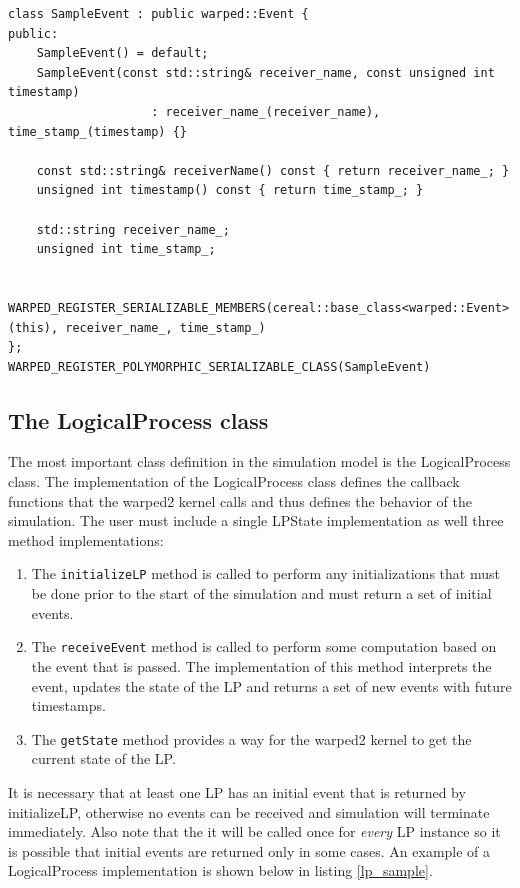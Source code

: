 \documentclass[11pt]{book}
\begin{document}
\begin{lstlisting}[caption=Sample \textsc{warped2} Event Definition, label=event_sample, float]
class SampleEvent : public warped::Event {
public:
    SampleEvent() = default;
    SampleEvent(const std::string& receiver_name, const unsigned int timestamp)
                    : receiver_name_(receiver_name), time_stamp_(timestamp) {}

    const std::string& receiverName() const { return receiver_name_; }
    unsigned int timestamp() const { return time_stamp_; }

    std::string receiver_name_;
    unsigned int time_stamp_;

    WARPED_REGISTER_SERIALIZABLE_MEMBERS(cereal::base_class<warped::Event>(this), receiver_name_, time_stamp_)
};
WARPED_REGISTER_POLYMORPHIC_SERIALIZABLE_CLASS(SampleEvent)
\end{lstlisting}

\subsection{The LogicalProcess class}

The most important class definition in the simulation model is the LogicalProcess class. The
implementation of the LogicalProcess class defines the callback functions that the warped2 kernel
calls and thus defines the behavior of the simulation. The user must include a single LPState
implementation as well three method implementations:

\begin{enumerate}

    \item The \texttt{initializeLP} method is called to perform any initializations that must
        be done prior to the start of the simulation and must return a set of initial events.
    \item The \texttt{receiveEvent} method is called to perform some computation based on the event
        that is passed. The implementation of this method interprets the event, updates the state
        of the LP and returns a set of new events with future timestamps.
    \item The \texttt{getState} method provides a way for the warped2 kernel to get the current
        state of the LP.

\end{enumerate}

It is necessary that at least one LP has an initial event that is returned by
initializeLP, otherwise no events can be received and simulation will terminate immediately.
Also note that the it will be called once for \emph{every} LP instance so it is possible that
initial events are returned only in some cases. An example of a LogicalProcess implementation is
shown below in listing \ref{lp_sample}.
\end{document}
